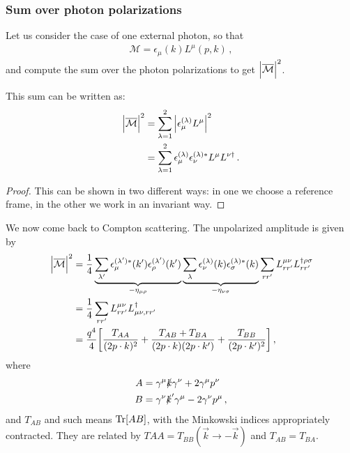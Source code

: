 \documentclass[main.tex]{subfiles}
\begin{document}

\subsubsection{Sum over photon polarizations}

Let us consider the case of one external photon,  so that 
%
\begin{align}
\mathcal{M} = \epsilon_{\mu } (k) L^{\mu } (p, k)
\,,
\end{align}
%
and compute the sum over the photon polarizations to get \(\abs{\mathcal{\overline{M}}}^2\). 

\begin{claim}
This sum can be written as:
%
\begin{align}
\abs{\mathcal{\overline{M}}}^2 &=
\sum _{\lambda = 1}^{2} 
\abs{\epsilon_{\mu }^{(\lambda )} L^{\mu }}^2  \\
&=
\sum _{\lambda = 1}^{2} 
\epsilon_{\mu }^{(\lambda )} \epsilon^{(\lambda )*}_{\nu } L^{\mu }L^{\nu \dag}
\,.
\end{align}
\end{claim}

\begin{proof}
This can be shown in two different ways: in one we choose a reference frame, in the other we work in an invariant way. 

\end{proof}

We now come back to Compton scattering. The unpolarized amplitude is given by 
%
\begin{align}
\abs{\mathcal{\overline{M}}}^2 &= 
\frac{1}{4} 
\underbrace{\sum_{\lambda' } 
\epsilon_{\mu }^{(\lambda' )*} (k')
\epsilon_{\rho }^{(\lambda' )} (k')}_{- \eta_{\mu \rho }}
\underbrace{\sum_{\lambda } 
\epsilon_{\nu }^{(\lambda )} (k)
\epsilon_{\sigma }^{(\lambda )*} (k)}_{- \eta_{\nu \sigma }}
\sum _{r r'} 
L^{\mu \nu }_{r r'}
L^{\dag \rho \sigma  }_{r r'}  \\
&= \frac{1}{4} 
\sum _{rr'}
L^{\mu \nu }_{r r'}
L^{\dag}_{ \mu \nu, r r'}  \\
&= \frac{q^{4}}{4}
\qty[ \frac{T_{AA}}{(2 p \cdot k)^2} +\frac{T_{AB} + T_{BA}}{(2 p \cdot k) (2 p \cdot k')} + \frac{T_{BB}}{(2 p \cdot k')^2}]
\,,
\end{align}
%
where 
%
\begin{align}
A &= \gamma^{\mu } \slashed{k} \gamma^{\nu } + 2 \gamma^{\mu } p^{\nu } \\
B &= \gamma^{\nu } \slashed{k}' \gamma^{\mu } - 2 \gamma^{\nu } p^{\mu } 
\,,
\end{align}
%
and \(T_{AB}\) and such means \(\Tr[AB]\), with the Minkowski indices appropriately contracted. They are related by \(T{AA} = T_{BB} (\vec{k} \to -\vec{k})\) and \(T_{AB} = T_{BA}\). 
\end{document}
